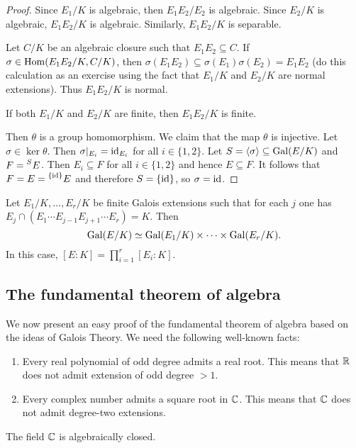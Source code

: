 \begin{proof}
    Since $E_1/K$ is algebraic, 
    then $E_1E_2/E_2$ is algebraic. Since $E_2/K$ is algebraic, $E_1E_2/K$ is algebraic. Similarly, 
    $E_1E_2/K$ is separable. 
    
    Let $C/K$ be an algebraic closure such that $E_1E_2\subseteq C$. If $\sigma\in\operatorname{Hom}(E_1E_2/K,C/K)$, then 
    $\sigma(E_1E_2)\subseteq\sigma(E_1)\sigma(E_2)=E_1E_2$ (do this calculation as an exercise using the fact that
    $E_1/K$ and $E_2/K$ are normal extensions). 
    Thus $E_1E_2/K$ is normal. 
    
    If both $E_1/K$ and $E_2/K$ are finite, then $E_1E_2/K$ is finite. 
    
    Then $\theta$ is a group homomorphism. We claim that the map $\theta$ is injective. Let $\sigma\in\ker\theta$. Then
    $\sigma|_{E_i}=\operatorname{id}_{E_i}$ for all $i\in\{1,2\}$. Let $S=\langle\sigma\rangle\subseteq\operatorname{Gal}(E/K)$ and
    $F=\prescript{S}{}{E}$. Then $E_i\subseteq F$ for all $i\in\{1,2\}$ and
    hence $E\subseteq F$. It follows that $F=E=\prescript{\{\operatorname{id}\}}{}{E}$ and therefore $S=\{\operatorname{id}\}$, so 
    $\sigma=\operatorname{id}$. 
\end{proof}

\begin{exercise}
    Let $E_1/K,\dots,E_r/K$ be finite Galois extensions such that for each $j$ 
    one has $E_j\cap (E_1\cdots E_{j-1}E_{j+1}\cdots E_r)=K$. Then 
    \[
    \operatorname{Gal}(E/K)\simeq\operatorname{Gal}(E_1/K)\times\cdots\times\operatorname{Gal}(E_r/K).
    \]
    In this case, $[E:K]=\prod_{i=1}^r[E_i:K]$. 
\end{exercise}

\subsection{The fundamental theorem of algebra}

We now present an easy proof of the fundamental theorem 
of algebra based on the ideas of Galois Theory. 
We need the following well-known facts:
\begin{enumerate}
\item Every real polynomial of odd degree admits a real root. This means that $\mathbb{R}$ 
does not admit extension of odd degree $>1$. 
\item Every complex number admits a square root in $\mathbb{C}$. This means that $\mathbb{C}$ 
does not admit degree-two extensions.
\end{enumerate}

\begin{theorem}
The field $\mathbb{C}$ is algebraically closed.
\end{theorem}

